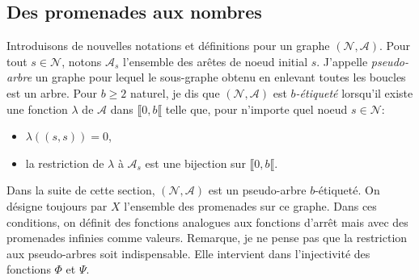 \subsection{Des promenades aux nombres} \label{SubSec:Prom2Nbs}
Introduisons de nouvelles notations et définitions pour un graphe $(\mathcal{N}, \mathcal{A})$.\newline
Pour tout $s\in \mathcal{N}$, notons $\mathcal{A}_s$ l'ensemble des arêtes de noeud initial $s$.\newline
J'appelle \emph{pseudo-arbre} un graphe pour lequel le sous-graphe obtenu en enlevant toutes les boucles est un arbre.\newline
Pour $b \geq 2$ naturel, je dis que $(\mathcal{N}, \mathcal{A})$ est \emph{$b$-étiqueté} lorsqu'il existe une fonction $\lambda$ de $\mathcal{A}$ dans $\llbracket 0, b \llbracket$ telle que, pour n'importe quel noeud $s\in \mathcal{N}$:
\begin{itemize}
 \item  $\lambda((s,s))=0$,
 \item la restriction de $\lambda$ à $\mathcal{A}_s$ est une bijection sur $\llbracket 0, b \llbracket$.
\end{itemize}
Dans la suite de cette section, $(\mathcal{N}, \mathcal{A})$ est un pseudo-arbre $b$-étiqueté. On désigne toujours par $X$ l'ensemble des promenades sur ce graphe.\newline
Dans ces conditions, on définit des fonctions analogues aux fonctions d'arrêt mais avec des promenades infinies comme valeurs.
\newline
Remarque, je ne pense pas que la restriction aux pseudo-arbres soit indispensable. Elle intervient dans l'injectivité des fonctions $\Phi$ et $\Psi$.

